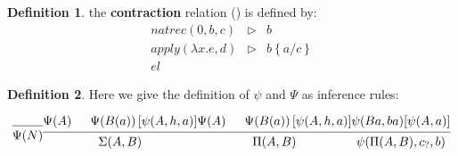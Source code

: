 \documentclass[11pt,a5paper,draft,oneside]{amsbook}
\theoremstyle{plain}%
\theoremstyle{definition}
\newtheorem{dede}{Definition}[section]
\theoremstyle{remark}
\newcommand{\ctr}{\triangleright}
\newcommand{\sbs}[3]{#1\left\lbrace #2 / #3 \right\rbrace}
\newcommand{\femph}{\textbf}
\begin{document}
	\begin{dede}
		the \femph{contraction} relation (\triangleright)
		is defined by:
		\begin{align}
		natrec(0, b, c) & \ctr & b \\
		apply(\lambda x.e, d) & \ctr & \sbs{b}{a}{c}\\
		el
		\end{align}			
	\end{dede}
	
	\begin{dede}
	Here we give the definition of $\psi$ and $\Psi$ as inference rules:
	
	\begin{multline}
	\begin{prooftree}
	\Infer{0}{\Psi(N)}
	\end{prooftree}	
	\begin{prooftree}
	\Hypo{\Psi(A)}
	\Hypo{\Psi(B(a)) \left[\psi(A,h,a)\right]}
	\Infer2{\Sigma(A,B)}		
	\end{prooftree}
	\begin{prooftree}
	\Hypo{\Psi(A)}
	\Hypo{\Psi(B(a)) \left[\psi(A,h,a)\right]}
	\Infer2{\Pi(A,B)}		
	\end{prooftree}
	\begin{prooftree}
		\Hypo{\psi(B a, b a) [\psi(A,a)]}
		\Infer{1}{\psi(\Pi(A,B),c_?,b)}
	\end{prooftree}		
	\end{multline}
	
	\end{dede}
\end{document}
